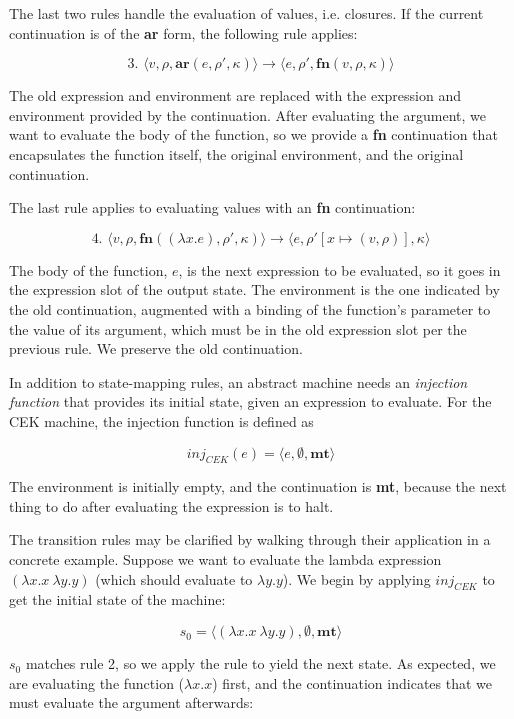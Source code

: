 \documentclass{article}
\begin{document}
The last two rules handle the evaluation of values, i.e. closures. If the current continuation is of the \textbf{ar} form, the following rule applies:

$$
\text{3. }
\langle v, \rho, \textbf{ar}(e, \rho', \kappa) \rangle
\to
\langle e, \rho', \textbf{fn}(v, \rho, \kappa) \rangle
$$

The old expression and environment are replaced with the expression and environment provided by the continuation. After evaluating the argument, we want to evaluate the body of the function, so we provide a \textbf{fn} continuation that encapsulates the function itself, the original environment, and the original continuation.

The last rule applies to evaluating values with an \textbf{fn} continuation:

$$
\text{4. }
\langle v, \rho, \textbf{fn}((\lambda x.e), \rho', \kappa) \rangle
\to
\langle e, \rho'[x \mapsto (v, \rho)], \kappa \rangle
$$

The body of the function, $e$, is the next expression to be evaluated, so it goes in the expression slot of the output state. The environment is the one indicated by the old continuation, augmented with a binding of the function's parameter to the value of its argument, which must be in the old expression slot per the previous rule. We preserve the old continuation.

In addition to state-mapping rules, an abstract machine needs an \textit{injection function} that provides its initial state, given an expression to evaluate. For the CEK machine, the injection function is defined as

$$ inj_{CEK}(e) = \langle e, \emptyset, \textbf{mt} \rangle $$

The environment is initially empty, and the continuation is \textbf{mt}, because the next thing to do after evaluating the expression is to halt.

The transition rules may be clarified by walking through their application in a concrete example. Suppose we want to evaluate the lambda expression $(\lambda x.x\ \lambda y.y)$ (which should evaluate to $\lambda y.y$). We begin by applying $inj_{CEK}$ to get the initial state of the machine:

$$ s_0 = \langle (\lambda x.x\ \lambda y.y), \emptyset, \textbf{mt} \rangle $$

$s_0$ matches rule 2, so we apply the rule to yield the next state. As expected, we are evaluating the function ($\lambda x.x$) first, and the continuation indicates that we must evaluate the argument afterwards:
\end{document}
